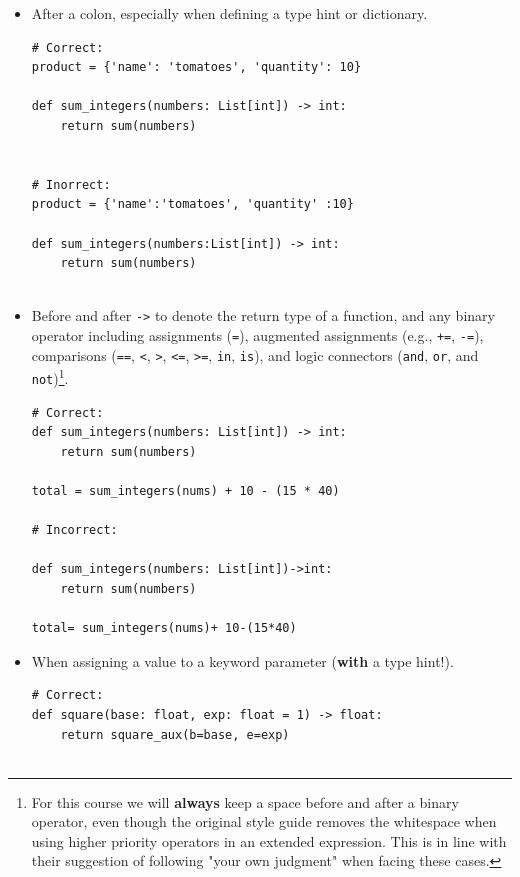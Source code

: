 \documentclass{tufte-handout}
\begin{document}
\begin{itemize}
	\item After a colon, especially when defining a type hint or dictionary.
	
\begin{mdframed}
\begin{verbatim}
# Correct:
product = {'name': 'tomatoes', 'quantity': 10}

def sum_integers(numbers: List[int]) -> int:
	return sum(numbers)
	
	
# Inorrect:
product = {'name':'tomatoes', 'quantity' :10}

def sum_integers(numbers:List[int]) -> int:
    return sum(numbers)
	
\end{verbatim}
\end{mdframed}
	
	\item Before and after \texttt{->} to denote the return type of a function, and any binary operator including assignments (\texttt{=}), augmented assignments (e.g., \texttt{+=}, \texttt{-=}), comparisons (\texttt{==}, \texttt{<}, \texttt{>}, \texttt{<=}, \texttt{>=}, \texttt{in}, \texttt{is}), and logic connectors (\texttt{and}, \texttt{or}, and \texttt{not})\footnote{For this course we will \textbf{always} keep a space before and after a binary operator, even though the original style guide removes the whitespace when using higher priority operators in an extended expression. This is in line with their suggestion of following "your own judgment" when facing these cases.}.

\begin{mdframed}
\begin{verbatim}
# Correct:
def sum_integers(numbers: List[int]) -> int:
    return sum(numbers)

total = sum_integers(nums) + 10 - (15 * 40)

# Incorrect:

def sum_integers(numbers: List[int])->int:
    return sum(numbers)
    
total= sum_integers(nums)+ 10-(15*40)

\end{verbatim}
\end{mdframed}
	
	\item When assigning a value to a keyword parameter (\textbf{with} a type hint!).
	
\begin{mdframed}
\begin{verbatim}
# Correct:
def square(base: float, exp: float = 1) -> float:
    return square_aux(b=base, e=exp)
			

\end{verbatim}
\end{mdframed}
\end{itemize}
\end{document}
